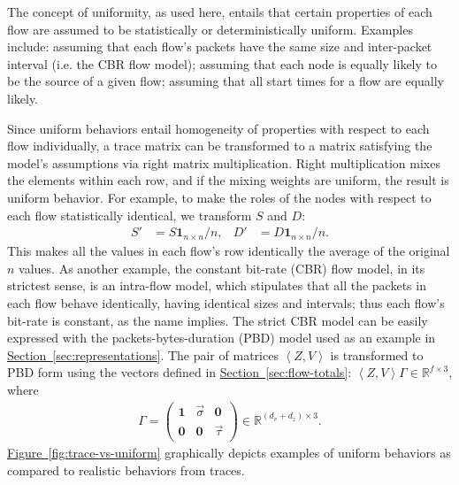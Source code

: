 \documentclass[twocolumn,final]{svjour3}
\newcommand{\caps}[1]{{\small{#1}}}
\newcommand{\Section}[1]{\hyperref[sec:#1]{Section~\ref*{sec:#1}}}
\newcommand{\Figure}[1]{\hyperref[fig:#1]{Figure~\ref*{fig:#1}}}
\newcommand{\R}{\mathbb{R}}
\newcommand{\ones}[1]{\mathbf{1}_{#1}}
\newcommand{\zeros}[1]{\mathbf{0}_{#1}}
\newcommand{\seq}[1]{\left<#1\right>}
\begin{document}
The concept of uniformity, as used here, entails that certain properties of each flow are assumed to be statistically or deterministically uniform. Examples include: assuming that each flow's packets have the same size and inter-packet interval (i.e. the \caps{CBR} flow model); assuming that each node is equally likely to be the source of a given flow; assuming that all start times for a flow are equally likely.

Since uniform behaviors entail homogeneity of properties with respect to each flow individually, a trace matrix can be transformed to a matrix satisfying the model's assumptions via right matrix multiplication. Right multiplication mixes the elements within each row, and if the mixing weights are uniform, the result is uniform behavior. For example, to make the roles of the nodes with respect to each flow statistically identical, we transform $S$ and $D$:
\begin{align*}
S' &= S\ones{n \times n}/n, & D' &= D\ones{n \times n}/n.
\end{align*}
This makes all the values in each flow's row identically the average of the original $n$ values. As another example, the constant bit-rate (\caps{CBR}) flow model, in its strictest sense, is an intra-flow model, which stipulates that all the packets in each flow behave identically, having identical sizes and intervals; thus each flow's bit-rate is constant, as the name implies. The strict \caps{CBR} model can be easily expressed with the packets-bytes-duration (\caps{PBD}) model used as an example in \Section{representations}. The pair of matrices $\seq{Z,V}$ is transformed to \caps{PBD} form using the vectors defined in \Section{flow-totals}: $\seq{Z,V}\Gamma\in\R^{f \times 3}$, where
\begin{align}
\Gamma=\begin{pmatrix}
\ones{} & \vec{\sigma} & \zeros{} \\
\zeros{} & \zeros{} & \vec{\tau}
\end{pmatrix} \in \R^{(d_v+d_z)\times{3}}.
\end{align}
\Figure{trace-vs-uniform} graphically depicts examples of uniform behaviors as compared to realistic behaviors from traces.

\end{document}

